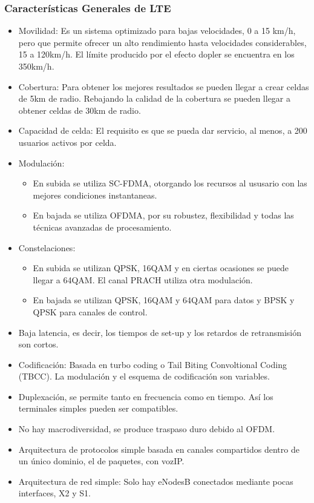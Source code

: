 	\subsubsection{Características Generales de LTE}
	\label{ssub:caracLTE}
		\begin{itemize}
			\item Movilidad: Es un sistema optimizado para bajas velocidades, 0 a 15 km/h, pero que permite ofrecer un alto rendimiento hasta velocidades considerables, 15 a 120km/h. El límite producido por el efecto dopler se encuentra en los 350km/h.
			\item Cobertura: Para obtener los mejores resultados se pueden llegar a crear celdas de 5km de radio. Rebajando la calidad de la cobertura se pueden llegar a obtener celdas de 30km de radio.
			\item Capacidad de celda: El requisito es que se pueda dar servicio, al menos, a 200 usuarios activos por celda.
			\item Modulación:
			\begin{itemize}
				\item En subida se utiliza SC-FDMA, otorgando los recursos al ususario con las mejores condiciones instantaneas.
				\item En bajada se utiliza OFDMA, por su robustez, flexibilidad y todas las técnicas avanzadas de procesamiento.
			\end{itemize}
			\item Constelaciones:
			\begin{itemize}
				\item En subida se utilizan QPSK, 16QAM y en ciertas ocasiones se puede llegar a 64QAM. El canal PRACH utiliza otra modulación.
				\item En bajada se utilizan QPSK, 16QAM y 64QAM para datos y BPSK y QPSK  para canales de control.
			\end{itemize}
			\item Baja latencia, es decir, los tiempos de set-up y los retardos de retransmisión son cortos.
			\item Codificación: Basada en turbo coding o Tail Biting Convoltional Coding (TBCC). La modulación y el esquema de codificación son variables.
			\item Duplexación, se permite tanto en frecuencia como en tiempo. Así los terminales simples pueden ser compatibles.
			\item No hay macrodiversidad, se produce traspaso duro debido al OFDM.
			\item Arquitectura de protocolos simple basada en canales compartidos dentro de un único dominio, el de paquetes, con vozIP.
			\item Arquitectura de red simple: Solo hay eNodesB conectados mediante pocas interfaces, X2 y S1.
		\end{itemize}
